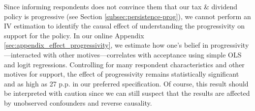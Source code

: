 \documentclass[12pt]{article} %
\begin{document}
Since informing respondents does not convince them that our tax \& dividend policy is progressive (see Section \ref{subsec:persistence-prog}), we cannot perform an IV estimation to identify the causal effect of understanding the progressivity on support for the policy. In our online Appendix \ref{sec:appendix_effect_progressivity}, we estimate how one's belief in progressivity---interacted with other motives---correlates with acceptance using simple OLS and logit regressions. Controlling for many respondent characteristics and other motives for support, the effect of progressivity remains statistically significant and as high as 27 p.p. in our preferred specification. Of course, this result should be interpreted with caution since we can still suspect that the results are affected by unobserved confounders and reverse causality.
\end{document}
